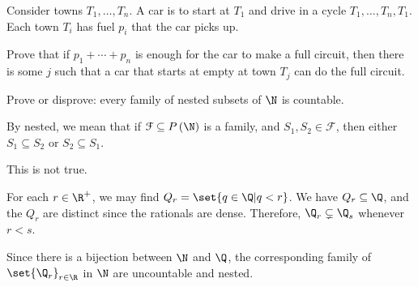 \documentclass[10pt]{mypackage}
\begin{document}
\begin{problem}
  Consider towns $T_1,\dots,T_n$. A car is to start at $T_1$ and drive in a cycle $T_1,\dots,T_n,T_1$. Each town $T_i$ has fuel $p_i$ that the car picks up.\newline

  Prove that if $p_1+\cdots+p_n$ is enough for the car to make a full circuit, then there is some $j$ such that a car that starts at empty at town $T_j$ can do the full circuit.
\end{problem}
\begin{problem}
  Prove or disprove: every family of nested subsets of $\N$ is countable.
\end{problem}
\begin{solution}
  By nested, we mean that if $\mathcal{F}\subseteq P\left( \N \right)$ is a family, and $S_1,S_2\in \mathcal{F}$, then either $S_1\subseteq S_2$ or $S_2\subseteq S_1$.\newline

  This is not true.\newline

  For each $r\in \R^{+}$, we may find $Q_r = \set{q \in \Q | q < r}$. We have $Q_r\subseteq \Q$, and the $Q_r$ are distinct since the rationals are dense. Therefore, $\Q_r\subsetneq \Q_s$ whenever $r < s$.\newline

  Since there is a bijection between $\N$ and $\Q$, the corresponding family of $\set{\Q_r}_{r\in\R}$ in $\N$ are uncountable and nested.
\end{solution}
\end{document}
